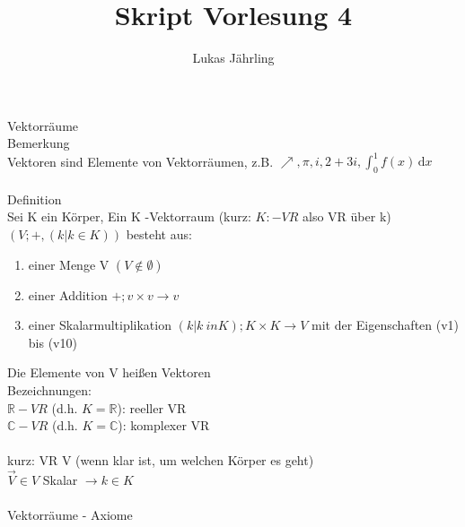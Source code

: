 \documentclass{scrartcl}
\title{Skript Vorlesung 4}
\author{Lukas Jährling}
\begin{document}
	\large
	Vektorräume
	\normalsize
	\\
	Bemerkung\\
	Vektoren sind Elemente von Vektorräumen, z.B. $\nearrow, \pi, i , 2+3i ,\int_{0}^{1}\!f(x)\,\mathrm{d}x$\\
	\\
	Definition\\
	Sei K ein Körper, Ein K -Vektorraum (kurz: $K:-VR$ also VR über k) $(V; +, (k|k\in K))$ besteht aus:\\
	\begin{enumerate}
		\item einer Menge V $(V \not \in \emptyset)$
		\item einer Addition $+; v\times v \rightarrow v$
		\item einer Skalarmultiplikation $(k|k \ in K); K \times K \rightarrow V$ mit der Eigenschaften (v1) bis (v10)
	\end{enumerate}
		Die Elemente von V heißen Vektoren
		\\
		Bezeichnungen:
		\\
		$\mathbb{R}-VR$ (d.h. $K=\mathbb{R}$): reeller VR\\
		$\mathbb{C}-VR$ (d.h. $K=\mathbb{C}$): komplexer VR\\
		\\
		kurz: VR V (wenn klar ist, um welchen Körper es geht)
		\\
		$\vec{V}\in V$ \hspace{2cm} Skalar $\rightarrow k\in K$ 
		\\
		\\
		Vektorräume - Axiome
\end{document}
